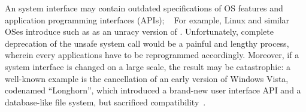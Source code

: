 An system interface may contain outdated specifications of OS features and application programming interfaces (APIs);
~
For example, Linux and similar OSes
introduce \linuxapis{} such as  as an unracy version
of .
Unfortunately, complete deprecation of the unsafe  system call
would be a painful and lengthy process,
wherein every applications have to be reprogrammed accordingly.
Moreover, if a system interface is changed on a large scale,
the result may be catastrophic:
a well-known example is the cancellation of an early version of Windows Vista, 
codenamed ``Longhorn'',
which introduced a brand-new user interface API
and a database-like file system, but sacrificed compatibility~\cite{spolsky04microsoft-api-war}.








